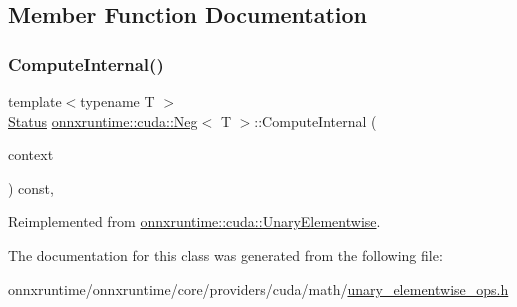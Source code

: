 \subsection{Member Function Documentation}
\mbox{\label{classonnxruntime_1_1cuda_1_1Neg_a7ff46cf8e38f3a9e57a428d33ef00e9e}} 
\subsubsection{\texorpdfstring{Compute\+Internal()}{ComputeInternal()}}
{\footnotesize\ttfamily template$<$typename T $>$ \\
\mbox{\hyperlink{classonnxruntime_1_1common_1_1Status}{Status}} \mbox{\hyperlink{classonnxruntime_1_1cuda_1_1Neg}{onnxruntime\+::cuda\+::\+Neg}}$<$ T $>$\+::Compute\+Internal (\begin{DoxyParamCaption}\item[{\mbox{\hyperlink{classonnxruntime_1_1OpKernelContext}{Op\+Kernel\+Context}} $\ast$}]{context }\end{DoxyParamCaption}) const\hspace{0.3cm}{\ttfamily [override]}, {\ttfamily [virtual]}}



Reimplemented from \mbox{\hyperlink{classonnxruntime_1_1cuda_1_1UnaryElementwise_abbbcb29c3937e2ac9e2ad768d9c69fca}{onnxruntime\+::cuda\+::\+Unary\+Elementwise}}.



The documentation for this class was generated from the following file\+:\begin{DoxyCompactItemize}
\item 
onnxruntime/onnxruntime/core/providers/cuda/math/\mbox{\hyperlink{unary__elementwise__ops_8h}{unary\+\_\+elementwise\+\_\+ops.\+h}}\end{DoxyCompactItemize}
